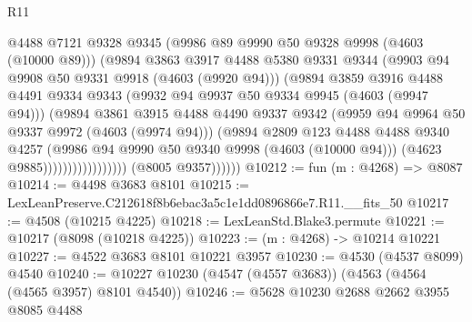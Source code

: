 \begin{lexlean}{R11}
\begin{coremodule}
                                      @4488
                                      @7121
                                      @9328
                                      @9345
                                      (@9986 @89 @9990 @50 @9328 @9998 (@4603 (@10000 @89)))
                                      (@9894
                                        @3863
                                        @3917
                                        @4488
                                        @5380
                                        @9331
                                        @9344
                                        (@9903 @94 @9908 @50 @9331 @9918 (@4603 (@9920 @94)))
                                        (@9894
                                          @3859
                                          @3916
                                          @4488
                                          @4491
                                          @9334
                                          @9343
                                          (@9932 @94 @9937 @50 @9334 @9945 (@4603 (@9947 @94)))
                                          (@9894
                                            @3861
                                            @3915
                                            @4488
                                            @4490
                                            @9337
                                            @9342
                                            (@9959 @94 @9964 @50 @9337 @9972 (@4603 (@9974 @94)))
                                            (@9894
                                              @2809
                                              @123
                                              @4488
                                              @4488
                                              @9340
                                              @4257
                                              (@9986 @94 @9990 @50 @9340 @9998 (@4603 (@10000 @94)))
                                              (@4623 @9885)))))))))))))))))
              (@8005 @9357))))))
@10212 := fun (m : @4268) => @8087
@10214 := @4498 @3683 @8101
@10215 := LexLeanPreserve.C212618f8b6ebac3a5c1e1dd0896866e7.R11.__fits_50
@10217 := @4508 (@10215 @4225)
@10218 := LexLeanStd.Blake3.permute
@10221 := @10217 (@8098 (@10218 @4225))
@10223 := (m : @4268) -> @10214 @10221
@10227 := @4522 @3683 @8101 @10221 @3957
@10230 := @4530 (@4537 @8099) @4540
@10240 := @10227 @10230 (@4547 (@4557 @3683)) (@4563 (@4564 (@4565 @3957) @8101 @4540))
@10246 := @5628 @10230 @2688 @2662 @3955 @8085 @4488

\end{coremodule}
\end{lexlean}
